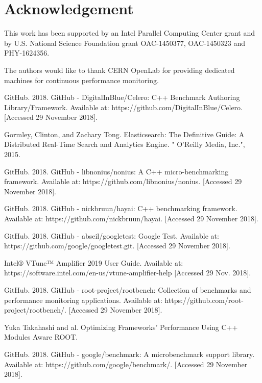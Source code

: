 \documentclass{webofc}
\begin{document}
\section{Acknowledgement}

This work has been supported by an Intel Parallel Computing Center grant and by U.S. National Science Foundation grant OAC-1450377, OAC-1450323 and PHY-1624356.

The  authors  would  like  to  thank CERN OpenLab for providing dedicated machines for continuous performance monitoring.

\begin{thebibliography}{plain}

GitHub. 2018. GitHub - DigitalInBlue/Celero: C++ Benchmark Authoring Library/Framework. Available at: https://github.com/DigitalInBlue/Celero. [Accessed 29 November 2018].
 
 Gormley, Clinton, and Zachary Tong. Elasticsearch: The Definitive Guide: A Distributed Real-Time Search and Analytics Engine. " O'Reilly Media, Inc.", 2015.
 
 GitHub. 2018. GitHub - libnonius/nonius: A C++ micro-benchmarking framework. Available at: https://github.com/libnonius/nonius. [Accessed 29 November 2018].
 
 GitHub. 2018. GitHub - nickbruun/hayai: C++ benchmarking framework. Available at: https://github.com/nickbruun/hayai. [Accessed 29 November 2018].
 
GitHub. 2018. GitHub - abseil/googletest: Google Test. Available at: https://github.com/google/googletest.git. [Accessed 29 November 2018].

Intel® VTune™ Amplifier 2019 User Guide. Available at: https://software.intel.com/en-us/vtune-amplifier-help [Accessed 29 Nov. 2018].

GitHub. 2018. GitHub - root-project/rootbench: Collection of benchmarks and performance monitoring applications. Available at: https://github.com/root-project/rootbench/. [Accessed 29 November 2018].

Yuka Takahashi and al. Optimizing Frameworks’ Performance Using C++ Modules Aware ROOT.


GitHub. 2018. GitHub - google/benchmark: A microbenchmark support library. Available at: https://github.com/google/benchmark/. [Accessed 29 November 2018].


\end{thebibliography}
\end{document}

